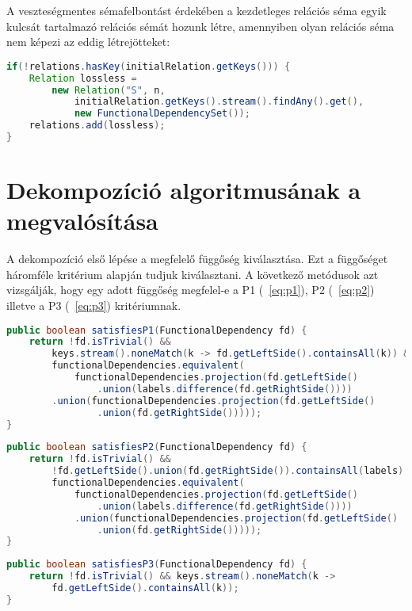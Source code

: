 A veszteségmentes sémafelbontást érdekében a kezdetleges relációs séma egyik kulcsát tartalmazó relációs sémát hozunk létre, amennyiben olyan relációs séma nem képezi az eddig létrejötteket:

\linespread{1}
\begin{lstlisting}[language=Java]
if(!relations.hasKey(initialRelation.getKeys())) {
	Relation lossless = 
		new Relation("S", n, 
			initialRelation.getKeys().stream().findAny().get(),
			new FunctionalDependencySet());
	relations.add(lossless);
}
\end{lstlisting}

\section{Dekompozíció algoritmusának a megvalósítása}

A dekompozíció első lépése a megfelelő függőség kiválasztása. Ezt a függőséget háromféle kritérium alapján tudjuk kiválasztani. A következő metódusok azt vizsgálják, hogy egy adott függőség megfelel-e a P1 (~\ref{eq:p1}), P2 (~\ref{eq:p2}) illetve a P3 (~\ref{eq:p3}) kritériumnak. 

\linespread{1}
\begin{lstlisting}[language=Java]
public boolean satisfiesP1(FunctionalDependency fd) {
	return !fd.isTrivial() &&
		keys.stream().noneMatch(k -> fd.getLeftSide().containsAll(k)) && 
		functionalDependencies.equivalent(
			functionalDependencies.projection(fd.getLeftSide()
				.union(labels.difference(fd.getRightSide())))
		.union(functionalDependencies.projection(fd.getLeftSide()
				.union(fd.getRightSide()))));
}
\end{lstlisting}

\linespread{1}
\begin{lstlisting}[language=Java]
public boolean satisfiesP2(FunctionalDependency fd) {
	return !fd.isTrivial() &&
		!fd.getLeftSide().union(fd.getRightSide()).containsAll(labels) &&
		functionalDependencies.equivalent(
			functionalDependencies.projection(fd.getLeftSide()
				.union(labels.difference(fd.getRightSide())))
			.union(functionalDependencies.projection(fd.getLeftSide()
				.union(fd.getRightSide()))));
}
\end{lstlisting}

\linespread{1}
\begin{lstlisting}[language=Java]
public boolean satisfiesP3(FunctionalDependency fd) {
	return !fd.isTrivial() && keys.stream().noneMatch(k ->
		fd.getLeftSide().containsAll(k));
}
\end{lstlisting}

